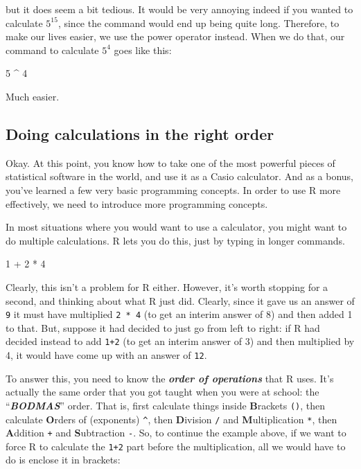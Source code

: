 \documentclass[
]{book}
\newenvironment{Shaded}{\begin{snugshade}}{\end{snugshade}}
\newcommand{\DecValTok}[1]{\textcolor[rgb]{0.00,0.00,0.81}{#1}}
\newcommand{\SpecialCharTok}[1]{\textcolor[rgb]{0.00,0.00,0.00}{#1}}
\begin{document}
but it does seem a bit tedious. It would be very annoying indeed if you wanted to calculate \(5^{15}\), since the command would end up being quite long. Therefore, to make our lives easier, we use the power operator instead. When we do that, our command to calculate \(5^4\) goes like this:

\begin{Shaded}
\begin{Highlighting}[]
\DecValTok{5} \SpecialCharTok{\^{}} \DecValTok{4}
\end{Highlighting}
\end{Shaded}

Much easier.

\hypertarget{bodmas}{%
\subsection{Doing calculations in the right order}\label{bodmas}}

Okay. At this point, you know how to take one of the most powerful pieces of statistical software in the world, and use it as a Casio calculator. And as a bonus, you've learned a few very basic programming concepts. In order to use R more effectively, we need to introduce more programming concepts.

In most situations where you would want to use a calculator, you might want to do multiple calculations. R lets you do this, just by typing in longer commands.

\begin{Shaded}
\begin{Highlighting}[]
\DecValTok{1} \SpecialCharTok{+} \DecValTok{2} \SpecialCharTok{*} \DecValTok{4}
\end{Highlighting}
\end{Shaded}

Clearly, this isn't a problem for R either. However, it's worth stopping for a second, and thinking about what R just did. Clearly, since it gave us an answer of \texttt{9} it must have multiplied \texttt{2\ *\ 4} (to get an interim answer of 8) and then added 1 to that. But, suppose it had decided to just go from left to right: if R had decided instead to add \texttt{1+2} (to get an interim answer of 3) and then multiplied by 4, it would have come up with an answer of \texttt{12}.

To answer this, you need to know the \textbf{\emph{order of operations}} that R uses. It's actually the same order that you got taught when you were at school: the ``\textbf{\emph{BODMAS}}'' order.
That is, first calculate things inside \textbf{B}rackets \texttt{()}, then calculate \textbf{O}rders of (exponents) \texttt{\^{}}, then \textbf{D}ivision \texttt{/} and \textbf{M}ultiplication \texttt{*}, then \textbf{A}ddition \texttt{+} and \textbf{S}ubtraction \texttt{-}. So, to continue the example above, if we want to force R to calculate the \texttt{1+2} part before the multiplication, all we would have to do is enclose it in brackets:
\end{document}
